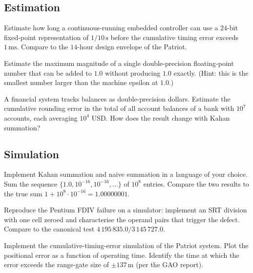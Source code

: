 \subsection*{Estimation}

\begin{exercise}
Estimate how long a continuous-running embedded controller can use a $24$-bit fixed-point representation of $1/10\,\si{\second}$ before the cumulative timing error exceeds $1\,\si{\milli\second}$. Compare to the $14$-hour design envelope of the Patriot.
\end{exercise}

\begin{exercise}
Estimate the maximum magnitude of a single double-precision floating-point number that can be added to $1.0$ without producing $1.0$ exactly. (Hint: this is the smallest number larger than the machine epsilon at $1.0$.)
\end{exercise}

\begin{exercise}
A financial system tracks balances as double-precision dollars. Estimate the cumulative rounding error in the total of all account balances of a bank with $10^7$ accounts, each averaging $10^4$ USD. How does the result change with Kahan summation?
\end{exercise}

\subsection*{Simulation}

\begin{exercise}
Implement Kahan summation and naive summation in a language of your choice. Sum the sequence $\{1.0, 10^{-16}, 10^{-16}, \ldots\}$ of $10^8$ entries. Compare the two results to the true sum $1 + 10^{8} \cdot 10^{-16} = 1.00000001$.
\end{exercise}

\begin{exercise}
Reproduce the Pentium FDIV failure on a simulator: implement an SRT division with one cell zeroed and characterise the operand pairs that trigger the defect. Compare to the canonical test $4\,195\,835.0 / 3\,145\,727.0$.
\end{exercise}

\begin{exercise}
Implement the cumulative-timing-error simulation of the Patriot system. Plot the positional error as a function of operating time. Identify the time at which the error exceeds the range-gate size of $\pm 137\,\si{\meter}$ (per the GAO report).
\end{exercise}

